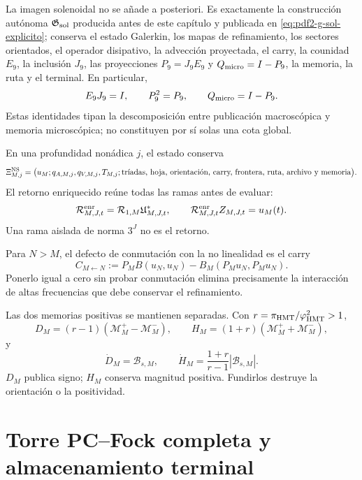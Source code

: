 La imagen solenoidal no se añade a posteriori. Es exactamente la construcción
autónoma $\mathfrak G_{\rm sol}$ producida antes de este capítulo y publicada en
\eqref{eq:pdf2-g-sol-explicito}; conserva el estado
Galerkin, los mapas de refinamiento, los sectores orientados, el operador disipativo,
la advección proyectada, el carry, la counidad $E_9$, la inclusión $J_9$, las
proyecciones $P_9=J_9E_9$ y $Q_{\rm micro}=I-P_9$, la memoria, la ruta y el terminal.
En particular,
\[
 E_9J_9=I,
 \qquad P_9^2=P_9,
 \qquad Q_{\rm micro}=I-P_9.
\]
Estas identidades tipan la descomposición entre publicación macroscópica y memoria
microscópica; no constituyen por sí solas una cota global.

En una profundidad nonádica $j$, el estado conserva
\begin{equation}\label{eq:pdf2-ns-estado}
 \Xi_{M,j}^{\rm NS}=
 \bigl(u_M;q_{A,M,j},q_{V,M,j},T_{M,j};
 \begin{gathered}
 \text{tríadas, hoja, orientación, carry, frontera, ruta, archivo y memoria}
 \end{gathered}
 \bigr).
\end{equation}
El retorno enriquecido reúne todas las ramas antes de evaluar:
\begin{equation}\label{eq:pdf2-ns-retorno}
 \mathcal R_{M,J,t}^{\rm enr}
 =\mathcal R_{1,M}\mathfrak U_{M,J,t}^*,
 \qquad
 \mathcal R_{M,J,t}^{\rm enr}Z_{M,J,t}=u_M(t).
\end{equation}
Una rama aislada de norma $3^J$ no es el retorno.

Para $N>M$, el defecto de conmutación con la no linealidad es el carry
\begin{equation}\label{eq:pdf2-ns-carry}
 C_{M\leftarrow N}:=
 P_MB(u_N,u_N)-B_M(P_Mu_N,P_Mu_N).
\end{equation}
Ponerlo igual a cero sin probar conmutación elimina precisamente la interacción de
altas frecuencias que debe conservar el refinamiento.

Las dos memorias positivas se mantienen separadas. Con
$r=\pi_{\rm HMT}/\varphi_{\rm HMT}^2>1$,
\begin{equation}\label{eq:pdf2-ns-dh}
 D_M=(r-1)(\mathcal M_M^+-\mathcal M_M^-),
 \qquad
 H_M=(1+r)(\mathcal M_M^++\mathcal M_M^-),
\end{equation}
y
\[
 \dot D_M=\mathscr B_{s,M},
 \qquad
 \dot H_M=\frac{1+r}{r-1}|\mathscr B_{s,M}|.
\]
$D_M$ publica signo; $H_M$ conserva magnitud positiva. Fundirlos destruye la
orientación o la positividad.

\section{Torre PC--Fock completa y almacenamiento terminal}

